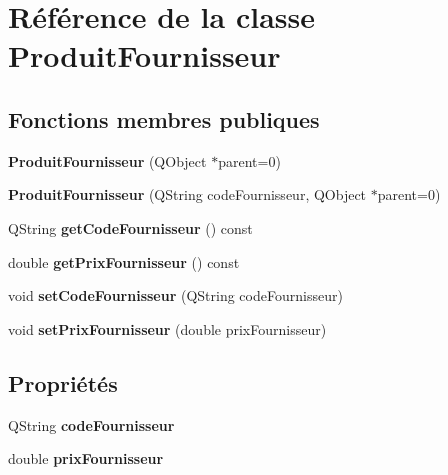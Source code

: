 \hypertarget{class_produit_fournisseur}{
\section{Référence de la classe ProduitFournisseur}
\label{d7/d25/class_produit_fournisseur}
}
\subsection*{Fonctions membres publiques}
\begin{DoxyCompactItemize}
\item 
\hypertarget{class_produit_fournisseur_a22947eda01faddbef3891aeb93d36097}{
{\bfseries ProduitFournisseur} (QObject $\ast$parent=0)}
\label{d7/d25/class_produit_fournisseur_a22947eda01faddbef3891aeb93d36097}

\item 
\hypertarget{class_produit_fournisseur_acb77ad5cee2d9b6f0884a78e86ce82e3}{
{\bfseries ProduitFournisseur} (QString codeFournisseur, QObject $\ast$parent=0)}
\label{d7/d25/class_produit_fournisseur_acb77ad5cee2d9b6f0884a78e86ce82e3}

\item 
\hypertarget{class_produit_fournisseur_ad4417fb8139c72f00d5fcd8397e3896e}{
QString {\bfseries getCodeFournisseur} () const }
\label{d7/d25/class_produit_fournisseur_ad4417fb8139c72f00d5fcd8397e3896e}

\item 
\hypertarget{class_produit_fournisseur_acde400669f987806b0fbf7f389d09cd5}{
double {\bfseries getPrixFournisseur} () const }
\label{d7/d25/class_produit_fournisseur_acde400669f987806b0fbf7f389d09cd5}

\item 
\hypertarget{class_produit_fournisseur_a8e79fe27057a189a8592b8e3eb68694f}{
void {\bfseries setCodeFournisseur} (QString codeFournisseur)}
\label{d7/d25/class_produit_fournisseur_a8e79fe27057a189a8592b8e3eb68694f}

\item 
\hypertarget{class_produit_fournisseur_a32302b4daa879762f32e77f8b44ec1c2}{
void {\bfseries setPrixFournisseur} (double prixFournisseur)}
\label{d7/d25/class_produit_fournisseur_a32302b4daa879762f32e77f8b44ec1c2}

\end{DoxyCompactItemize}
\subsection*{Propriétés}
\begin{DoxyCompactItemize}
\item 
\hypertarget{class_produit_fournisseur_a4292080c383cb8c3f020ef6587e35374}{
QString {\bfseries codeFournisseur}}
\label{d7/d25/class_produit_fournisseur_a4292080c383cb8c3f020ef6587e35374}

\item 
\hypertarget{class_produit_fournisseur_a11a5ae56e13eedfdbc5bd56b091785b6}{
double {\bfseries prixFournisseur}}
\label{d7/d25/class_produit_fournisseur_a11a5ae56e13eedfdbc5bd56b091785b6}

\end{DoxyCompactItemize}


